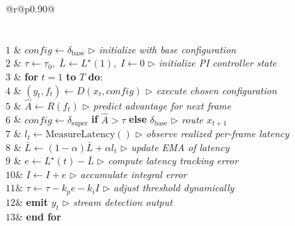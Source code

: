 \begin{algorithm}[!t]
\caption{Causal budget-adaptive depth routing (deployment)}
\label{alg:routing}
\small
\begin{tabular}{@{}r@{\hspace{5pt}}p{}@{}}
\\
\\
\\[2pt]
$1$ & $\mathit{config} \leftarrow \delta_{\text{base}}$ \hfill{\footnotesize\itshape $\triangleright$ initialize with base configuration}\\
$2$ & $\tau \leftarrow \tau_0, \;\bar{L} \leftarrow L^\star(1), \;I \leftarrow 0$ \hfill{\footnotesize\itshape $\triangleright$ initialize PI controller state}\\
$3$ & \textbf{for} $t=1$ \textbf{to} $T$ \textbf{do}$:$\\
$4$ & \quad $(y_t, f_t) \leftarrow D(x_t, \mathit{config})$ \hfill{\footnotesize\itshape $\triangleright$ execute chosen configuration}\\
$5$ & \quad $\hat{A} \leftarrow R(f_t)$ \hfill{\footnotesize\itshape $\triangleright$ predict advantage for next frame}\\
$6$ & \quad $\mathit{config} \leftarrow \delta_{\text{super}}$ \textbf{if} $\hat{A} > \tau$ \textbf{else} $\delta_{\text{base}}$ \hfill{\footnotesize\itshape $\triangleright$ route $x_{t+1}$}\\
$7$ & \quad $l_t \leftarrow \text{MeasureLatency}()$ \hfill{\footnotesize\itshape $\triangleright$ observe realized per-frame latency}\\
$8$ & \quad $\bar{L} \leftarrow (1-\alpha)\bar{L} + \alpha l_t$ \hfill{\footnotesize\itshape $\triangleright$ update EMA of latency}\\
$9$ & \quad $e \leftarrow L^\star(t) - \bar{L}$ \hfill{\footnotesize\itshape $\triangleright$ compute latency tracking error}\\
$10$& \quad $I \leftarrow I + e$ \hfill{\footnotesize\itshape $\triangleright$ accumulate integral error}\\
$11$& \quad $\tau \leftarrow \tau - k_p e - k_i I$ \hfill{\footnotesize\itshape $\triangleright$ adjust threshold dynamically}\\
$12$& \quad \textbf{emit} $y_t$ \hfill{\footnotesize\itshape $\triangleright$ stream detection output}\\
$13$& \textbf{end for}
\end{tabular}
\end{algorithm}



